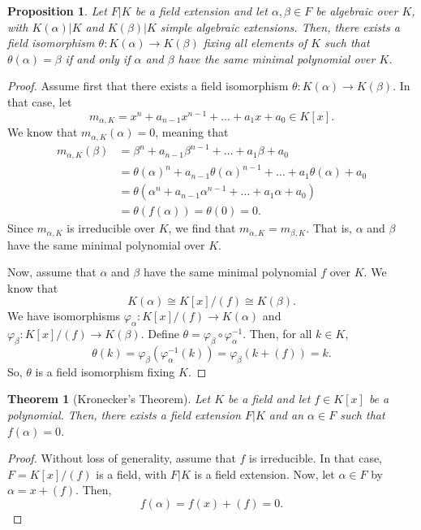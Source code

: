 \documentclass[a4paper, openany]{memoir}
\theoremstyle{definition}
\theoremstyle{plain}
\newtheorem{theorem}[definition]{Theorem}
\newtheorem{proposition}[definition]{Proposition}
\begin{document}
    \begin{proposition}
        Let $F|K$ be a field extension and let $\alpha, \beta \in F$ be algebraic over $K$, with $K(\alpha)|K$ and $K(\beta)|K$ simple algebraic extensions. Then, there exists a field isomorphism $\theta \colon K(\alpha) \to K(\beta)$ fixing all elements of $K$ such that $\theta(\alpha) = \beta$ if and only if $\alpha$ and $\beta$ have the same minimal polynomial over $K$.
    \end{proposition}
    \begin{proof}
        Assume first that there exists a field isomorphism $\theta \colon K(\alpha) \to K(\beta)$. In that case, let 
        \[m_{\alpha, K} = x^n + a_{n-1} x^{n-1} + \dots + a_1 x + a_0 \in K[x].\]
        We know that $m_{\alpha, K}(\alpha) = 0$, meaning that
        \begin{align*}
            m_{\alpha, K}(\beta) &= \beta^n + a_{n-1} \beta^{n-1} + \dots + a_1 \beta + a_0 \\
            &= \theta(\alpha)^n + a_{n-1} \theta(\alpha)^{n-1} + \dots + a_1 \theta(\alpha) + a_0 \\
            &= \theta(\alpha^n + a_{n-1} \alpha^{n-1} + \dots + a_1 \alpha + a_0) \\
            &= \theta(f(\alpha)) = \theta(0) = 0.
        \end{align*}
        Since $m_{\alpha, K}$ is irreducible over $K$, we find that $m_{\alpha, K} = m_{\beta, K}$. That is, $\alpha$ and $\beta$ have the same minimal polynomial over $K$.

        Now, assume that $\alpha$ and $\beta$ have the same minimal polynomial $f$ over $K$. We know that
        \[K(\alpha) \cong K[x]/(f) \cong K(\beta).\]
        We have isomorphisms $\varphi_\alpha \colon K[x]/(f) \to K(\alpha)$ and $\varphi_\beta \colon K[x]/(f) \to K(\beta)$. Define $\theta = \varphi_\beta \circ \varphi_{\alpha}^{-1}$. Then, for all $k \in K$,
        \[\theta(k) = \varphi_\beta(\varphi_\alpha^{-1}(k)) = \varphi_\beta(k + (f)) = k.\]
        So, $\theta$ is a field isomorphism fixing $K$.
    \end{proof}

    \begin{theorem}[Kronecker's Theorem]
        Let $K$ be a field and let $f \in K[x]$ be a polynomial. Then, there exists a field extension $F|K$ and an $\alpha \in F$ such that $f(\alpha) = 0$.
    \end{theorem}
    \begin{proof}
        Without loss of generality, assume that $f$ is irreducible. In that case, $F = K[x]/(f)$ is a field, with $F|K$ is a field extension. Now, let $\alpha \in F$ by $\alpha = x + (f)$. Then,
        \[f(\alpha) = f(x) + (f) = 0.\]
    \end{proof}
\end{document}
